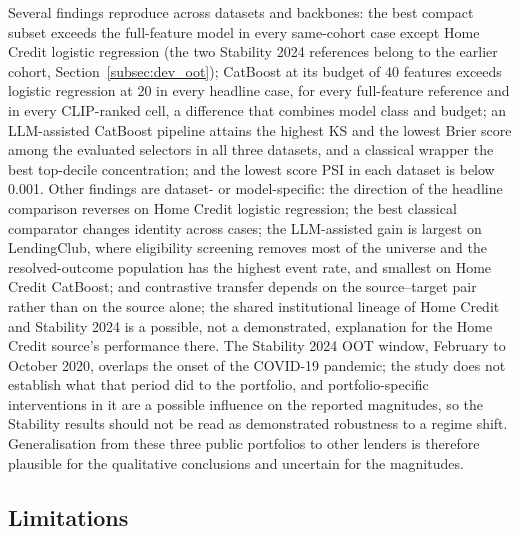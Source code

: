 \documentclass[final,5p,twocolumn]{elsarticle}
\begin{document}
Several findings reproduce across datasets and backbones: the best compact subset exceeds the full-feature model in every same-cohort case except Home Credit logistic regression (the two Stability 2024 references belong to the earlier cohort, Section~\ref{subsec:dev_oot}); CatBoost at its budget of 40 features exceeds logistic regression at 20 in every headline case, for every full-feature reference and in every CLIP-ranked cell, a difference that combines model class and budget; an LLM-assisted CatBoost pipeline attains the highest KS and the lowest Brier score among the evaluated selectors in all three datasets, and a classical wrapper the best top-decile concentration; and the lowest score PSI in each dataset is below 0.001. Other findings are dataset- or model-specific: the direction of the headline comparison reverses on Home Credit logistic regression; the best classical comparator changes identity across cases; the LLM-assisted gain is largest on LendingClub, where eligibility screening removes most of the universe and the resolved-outcome population has the highest event rate, and smallest on Home Credit CatBoost; and contrastive transfer depends on the source--target pair rather than on the source alone; the shared institutional lineage of Home Credit and Stability 2024 is a possible, not a demonstrated, explanation for the Home Credit source's performance there. The Stability 2024 OOT window, February to October 2020, overlaps the onset of the COVID-19 pandemic; the study does not establish what that period did to the portfolio, and portfolio-specific interventions in it are a possible influence on the reported magnitudes, so the Stability results should not be read as demonstrated robustness to a regime shift. Generalisation from these three public portfolios to other lenders is therefore plausible for the qualitative conclusions and uncertain for the magnitudes.

\subsection{Limitations}
\label{subsec:limitations}
\end{document}
